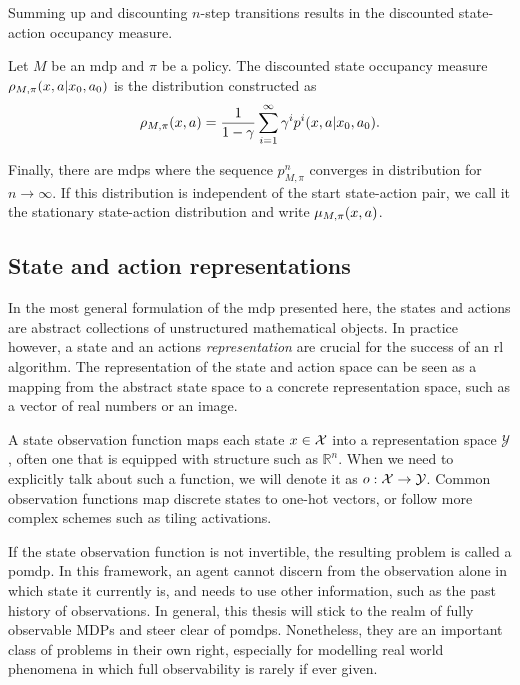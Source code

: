 Summing up and discounting $n$-step transitions results in the discounted state-action occupancy measure.

\begin{definition}
    Let $M$ be an \ac{mdp} and $\pi$ be a policy.
    The discounted state occupancy measure $\rho_{M,\pi}(x,a|x_0,a_0)$ is the distribution constructed as $$\rho_{M,\pi}(x,a) = \frac{1}{1 - \gamma} \sum_{i=1}^\infty \gamma^i p^i(x,a|x_0,a_0).$$
\end{definition}

Finally, there are \acp{mdp} where the sequence $p^n_{M,\pi}$ converges in distribution for $n \rightarrow \infty$.
If this distribution is independent of the start state-action pair, we call it the stationary state-action distribution and write $\mu_{M,\pi}(x,a)$.

\subsection{State and action representations}

In the most general formulation of the \ac{mdp} presented here, the states and actions are abstract collections of unstructured mathematical objects.
In practice however, a state and an actions \emph{representation} are crucial for the success of an \ac{rl} algorithm.
The representation of the state and action space can be seen as a mapping from the abstract state space to a concrete representation space, such as a vector of real numbers or an image.

A state observation function maps each state $x\in\mathcal{X}$ into a representation space $\mathcal{Y}$, often one that is equipped with structure such as $\mathbb{R}^n$.
When we need to explicitly talk about such a function, we will denote it as $o: \mathcal{X} \rightarrow \mathcal{Y}$.
Common observation functions map discrete states to one-hot vectors, or follow more complex schemes such as tiling activations.

If the state observation function is not invertible, the resulting problem is called a \ac{pomdp}.
In this framework, an agent cannot discern from the observation alone in which state it currently is, and needs to use other information, such as the past history of observations.
In general, this thesis will stick to the realm of fully observable MDPs and steer clear of \acp{pomdp}.
Nonetheless, they are an important class of problems in their own right, especially for modelling real world phenomena in which full observability is rarely if ever given.

